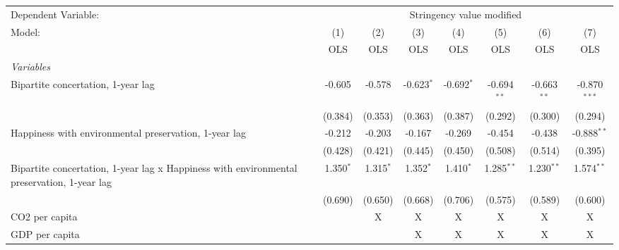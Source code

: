 
\begingroup
\centering
\begin{tabular}{lccccccc}
   \toprule
   Dependent Variable: & \multicolumn{7}{c}{Stringency value modified}\\
   Model:                                                                                     & (1)         & (2)         & (3)          & (4)          & (5)           & (6)           & (7)\\  
                                                                                              &  OLS        & OLS         & OLS          & OLS          & OLS           & OLS           & OLS\\  
   \midrule
   \emph{Variables}\\
   Bipartite concertation, 1-year lag                                                         & -0.605      & -0.578      & -0.623$^{*}$ & -0.692$^{*}$ & -0.694$^{**}$ & -0.663$^{**}$ & -0.870$^{***}$\\   
                                                                                              & (0.384)     & (0.353)     & (0.363)      & (0.387)      & (0.292)       & (0.300)       & (0.294)\\   
   Happiness with environmental preservation, 1-year lag                                      & -0.212      & -0.203      & -0.167       & -0.269       & -0.454        & -0.438        & -0.888$^{**}$\\   
                                                                                              & (0.428)     & (0.421)     & (0.445)      & (0.450)      & (0.508)       & (0.514)       & (0.395)\\   
   Bipartite concertation, 1-year lag x Happiness with environmental preservation, 1-year lag & 1.350$^{*}$ & 1.315$^{*}$ & 1.352$^{*}$  & 1.410$^{*}$  & 1.285$^{**}$  & 1.230$^{**}$  & 1.574$^{**}$\\   
                                                                                              & (0.690)     & (0.650)     & (0.668)      & (0.706)      & (0.575)       & (0.589)       & (0.600)\\   
   CO2 per capita                                                                             &             & X           & X            & X            & X             & X             & X\\  
   GDP per capita                                                                             &             &             & X            & X            & X             & X             & X\\  

\end{tabular}
